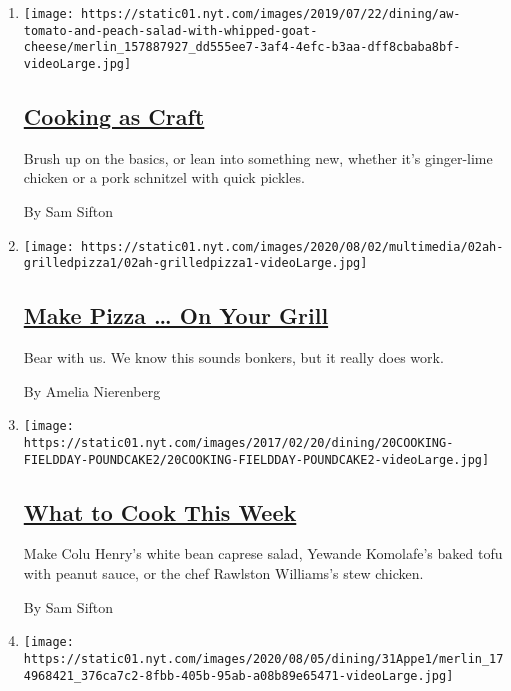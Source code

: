 \begin{enumerate}
\def\labelenumi{\arabic{enumi}.}
\item
  \texttt{[image: https://static01.nyt.com/images/2019/07/22/dining/aw-tomato-and-peach-salad-with-whipped-goat-cheese/merlin\_157887927\_dd555ee7-3af4-4efc-b3aa-dff8cbaba8bf-videoLarge.jpg]}

  \hypertarget{cooking-as-craft}{%
  \subsection{\texorpdfstring{\href{/2020/08/03/dining/cooking-as-craft.html}{Cooking
  as Craft}}{Cooking as Craft}}\label{cooking-as-craft}}

  Brush up on the basics, or lean into something new, whether it's
  ginger-lime chicken or a pork schnitzel with quick pickles.

  By Sam Sifton
\item
  \texttt{[image: https://static01.nyt.com/images/2020/08/02/multimedia/02ah-grilledpizza1/02ah-grilledpizza1-videoLarge.jpg]}

  \hypertarget{make-pizza--on-your-grill}{%
  \subsection{\texorpdfstring{\href{/2020/08/01/at-home/coronavirus-make-pizza-on-a-grill.html}{Make
  Pizza \ldots{} On Your
  Grill}}{Make Pizza \ldots{} On Your Grill}}\label{make-pizza--on-your-grill}}

  Bear with us. We know this sounds bonkers, but it really does work.

  By Amelia Nierenberg
\item
  \texttt{[image: https://static01.nyt.com/images/2017/02/20/dining/20COOKING-FIELDDAY-POUNDCAKE2/20COOKING-FIELDDAY-POUNDCAKE2-videoLarge.jpg]}

  \hypertarget{what-to-cook-this-week}{%
  \subsection{\texorpdfstring{\href{/2020/08/02/dining/what-to-cook-this-week.html}{What
  to Cook This
  Week}}{What to Cook This Week}}\label{what-to-cook-this-week}}

  Make Colu Henry's white bean caprese salad, Yewande Komolafe's baked
  tofu with peanut sauce, or the chef Rawlston Williams's stew chicken.

  By Sam Sifton
\item
  \texttt{[image: https://static01.nyt.com/images/2020/08/05/dining/31Appe1/merlin\_174968421\_376ca7c2-8fbb-405b-95ab-a08b89e65471-videoLarge.jpg]}


\end{enumerate}
